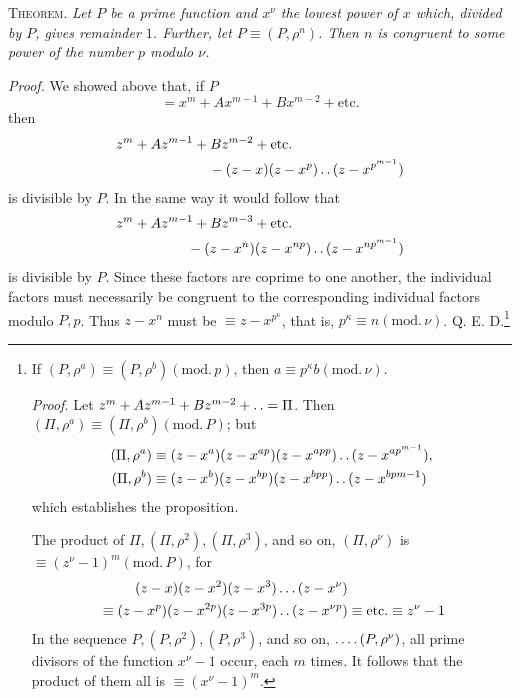 \clearpage
{}
\textsc{Theorem.} \emph{Let $P$ be a prime function and $x^\nu$ the lowest power of $x$ which, divided by $P$, gives remainder $1$. Further, let $P\equiv(P,\rho^n)$. Then $n$ is congruent to some power of the number $p$ modulo $\nu$.}

\emph{Proof.} We showed above that, if $P$
\[
=x^m+Ax^{m-1}+Bx^{m-2}+\text{etc.}
\]
then
\[
\begin{aligned}
z^m+Az^{m-1}+Bz^{m-2}+\text{etc.}\qquad\qquad\qquad\qquad&\\
{}-(z-x)(z-x^p)\mathinner{.\,.}(z-x^{p^{m-1}})&
\end{aligned}
\]
is divisible by $P$. In the same way it would follow that
\[
\begin{aligned}
z^m+Az^{m-1}+Bz^{m-3}+\text{etc.}\qquad\qquad\qquad\qquad&\\
{}-(z-x^n)(z-x^{np})\mathinner{.\,.}(z-x^{np^{m-1}})&
\end{aligned}
\]
is divisible by $P$. Since these factors are coprime to one another, the individual factors must necessarily be congruent to the corresponding individual factors modulo $P,p$. Thus $z-x^n$ must be $\equiv z-x^{p^\kappa}$, that is, $p^\kappa\equiv n(\mathrm{mod.}\,\nu)$. Q. E. D.\begingroup{}\relax\renewcommand{\thefootnote}{*)}\footnote{If $(P,\rho^a)\equiv(P,\rho^b)(\mathrm{mod.}\,p)$, then $a\equiv p^\kappa b(\mathrm{mod.}\,\nu)$.

\emph{Proof.} Let $z^m+Az^{m-1}+Bz^{m-2}+\mathinner{.\,.}=\Pi$. Then $(\Pi,\rho^a)\equiv(\Pi,\rho^b)(\mathrm{mod.}\,P)$; but
\[
\begin{aligned}
(\Pi,\rho^a)&\equiv(z-x^a)(z-x^{ap})(z-x^{app})\mathinner{.\,.}(z-x^{ap^{m-1}}),\\
(\Pi,\rho^b)&\equiv(z-x^b)(z-x^{bp})(z-x^{bpp})\mathinner{.\,.}(z-x^{bpm-1})
\end{aligned}
\]
which establishes the proposition.

The product of $\Pi,(\Pi,\rho^2),(\Pi,\rho^3)$, and so on, $(\Pi,\rho^\nu)$ is $\equiv(z^\nu-1)^m(\mathrm{mod.}\,P)$, for
\[
\begin{aligned}
(z-x)(z-x^2)(z-x^3)\ldots(z-x^\nu)&\\
{}\equiv(z-x^p)(z-x^{2p})(z-x^{3p})\mathinner{.\,.}(z-x^{\nu p})&\equiv\text{etc.}\equiv z^\nu-1
\end{aligned}
\]
In the sequence $P,(P,\rho^2),(P,\rho^3)$, and so on, $\mathinner{.\,.\,.\,.}(P,\rho^\nu)$, all prime divisors of the function $x^\nu-1$ occur, each $m$ times. It follows that the product of them all is $\equiv(x^\nu-1)^m$.}\endgroup

